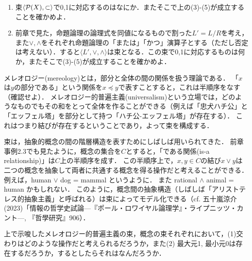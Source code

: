 \documentclass[11pt,a4paper]{jsarticle}
\begin{document}
\begin{exercise}
\begin{enumerate} \label{logic}
    \item 束$\langle \mathcal{P}(X), \subset \rangle$で0,1に対応するのはなにか．またそこで上の(3)-(5)が成立することを確かめよ．
    \item 前章で見た，命題論理の論理式を同値になるもので割った$L'= L/R$を考え，また$\vee, \wedge$をそれぞれ命題論理の「または」「かつ」演算子とする（ただし否定は考えない）．すると$\langle L', \vee, \wedge \rangle$は束となる．この束で0,1に対応するものは何か，またそこで(3)-(5)が成立することを確かめよ．
\end{enumerate}
\end{exercise}

\begin{example}[メレオロジー] \label{mereology}
メレオロジー(mereology)とは，部分と全体の間の関係を扱う理論である．
「$x$は$y$の部分である」という関係を$x \preceq y$で表すことすると，これは半順序をなす（確認せよ）．
メレオロジー的普遍主義(universalism)という立場では，どのようなものでもその和をとって全体を作ることができる（例えば「忠犬ハチ公」と「エッフェル塔」を部分として持つ「ハチ公-エッフェル塔」が存在する）．
これはつまり結びが存在するということであり，よって束を構成する．
\end{example}

\begin{example}[概念の束] \label{concept}
束は，抽象的概念の間の階層構造を表すためにしばしば用いられてきた．
前章事例2.3でも見たように，概念の集合を$C$とすると，「である関係(is-a relationship)」は$C$上の半順序を成す．
この半順序上で，$x, y \in C$の結び$x \vee y$は二つの概念を抽象して両者に共通する概念を得る操作だと考えることができる．
例えば，human $\vee$ dog = mammal というように．
また rational $\wedge$ animal = human かもしれない．
このように，概念間の抽象構造（しばしば「アリストテレス的抽象主義」と呼ばれる）は束によってモデル化できる（cf. 五十嵐涼介(2023)「情報の哲学史試論---『ポール・ロワイヤル論理学』・ライプニッツ・カント---, 『哲學研究』906）．
\end{example}

\begin{exercise} 
上で示唆したメレオロジー的普遍主義の束，概念の束それぞれにおいて，(1)交わりはどのような操作だと考えられるだろうか，また(2) 最大元1, 最小元0は存在するだろうか，するとしたらそれはなんだろうか．
\end{exercise}
\end{document}
